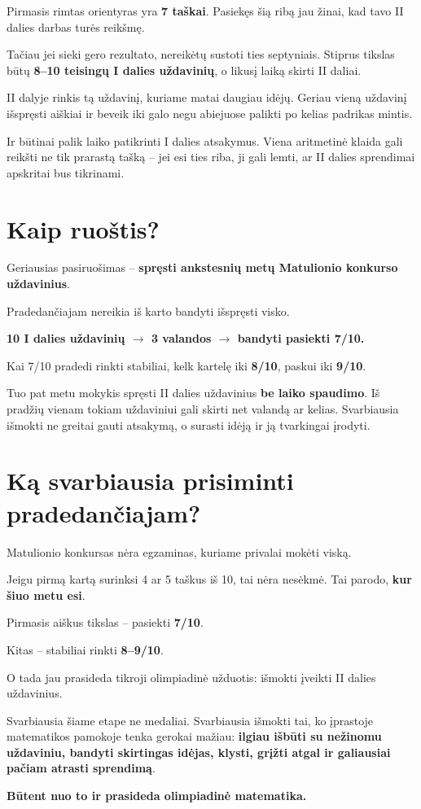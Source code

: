 \documentclass[11pt,a4paper]{article}
\newcommand{\calloutbox}[1]{%
  \begin{center}
  \colorbox{callout}{%
    \parbox{0.94\textwidth}{\centering\bfseries #1}%
  }
  \end{center}
}
\begin{document}
Pirmasis rimtas orientyras yra \textbf{7 taškai}. Pasiekęs šią ribą jau žinai, kad tavo II dalies darbas turės reikšmę.

Tačiau jei sieki gero rezultato, nereikėtų sustoti ties septyniais. Stiprus tikslas būtų \textbf{8--10 teisingų I dalies uždavinių}, o likusį laiką skirti II daliai.

II dalyje rinkis tą uždavinį, kuriame matai daugiau idėjų. Geriau vieną uždavinį išspręsti aiškiai ir beveik iki galo negu abiejuose palikti po kelias padrikas mintis.

Ir būtinai palik laiko patikrinti I dalies atsakymus. Viena aritmetinė klaida gali reikšti ne tik prarastą tašką -- jei esi ties riba, ji gali lemti, ar II dalies sprendimai apskritai bus tikrinami.

\section{Kaip ruoštis?}

Geriausias pasiruošimas -- \textbf{spręsti ankstesnių metų Matulionio konkurso uždavinius}.

Pradedančiajam nereikia iš karto bandyti išspręsti visko.

\calloutbox{10 I dalies uždavinių $\rightarrow$ 3 valandos $\rightarrow$ bandyti pasiekti 7/10.}

Kai 7/10 pradedi rinkti stabiliai, kelk kartelę iki \textbf{8/10}, paskui iki \textbf{9/10}.

Tuo pat metu mokykis spręsti II dalies uždavinius \textbf{be laiko spaudimo}. Iš pradžių vienam tokiam uždaviniui gali skirti net valandą ar kelias. Svarbiausia išmokti ne greitai gauti atsakymą, o surasti idėją ir ją tvarkingai įrodyti.

\section{Ką svarbiausia prisiminti pradedančiajam?}

Matulionio konkursas nėra egzaminas, kuriame privalai mokėti viską.

Jeigu pirmą kartą surinksi 4 ar 5 taškus iš 10, tai nėra nesėkmė. Tai parodo, \textbf{kur šiuo metu esi}.

Pirmasis aiškus tikslas -- pasiekti \textbf{7/10}.

Kitas -- stabiliai rinkti \textbf{8--9/10}.

O tada jau prasideda tikroji olimpiadinė užduotis: išmokti įveikti II dalies uždavinius.

Svarbiausia šiame etape ne medaliai. Svarbiausia išmokti tai, ko įprastoje matematikos pamokoje tenka gerokai mažiau: \textbf{ilgiau išbūti su nežinomu uždaviniu, bandyti skirtingas idėjas, klysti, grįžti atgal ir galiausiai pačiam atrasti sprendimą}.

\begin{center}
\textbf{Būtent nuo to ir prasideda olimpiadinė matematika.}
\end{center}
\end{document}

